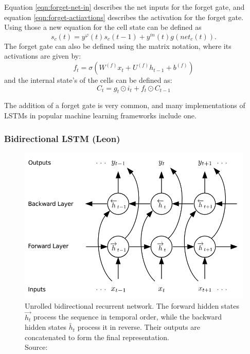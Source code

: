 \documentclass[twoside,a4paper,10pt,DIV=12,BCOR=12mm]{scrartcl}
\begin{document}
Equation \ref{eqn:forget-net-in} describes the net inputs for the forget gate, and equation \ref{eqn:forget-actiavtions} describes the activation for the forget gate. Using those a new equation for the cell state can be defined as\cite{gers1999forgetgate}
\begin{equation}
    s_c(t)=y^\varphi(t)s_c(t-1)+y^{in}(t)g\left(net_c(t)\right).    
\end{equation}
The forget gate can also be defined using the matrix notation, where its activations are given by:\cite{smagulova2019notation}
$$f_t=\sigma\left(W^{(f)}x_t+U^{(f)}h_{t-1}+b^{(f)}\right)$$
and the internal state's of the cells can be defined as:\cite{smagulova2019notation}
$$C_t=g_t\odot i_t+f_t\odot C_{t-1}$$

The addition of a forget gate is very common, and many implementations of LSTMs in popular machine learning frameworks include one.\cite{smagulova2019notation,keras-lstm, real-pytorch-lstm, pytorch-lstm} 

\subsubsection{Bidirectional LSTM (Leon)}

\begin{figure}[h!]
    \centering
    \includegraphics[height=7.5cm]{brnn.png}
    \caption{Unrolled bidirectional recurrent network. The forward hidden states $\overrightarrow{h_t}$ process the sequence in temporal order, while the backward hidden states $\overleftarrow{h_t}$ process it in reverse. Their outputs are concatenated to form the final representation.\\ Source: \cite{graves2013speechrecognitiondeeprecurrent}}
    \label{fig:brnn}
\end{figure}
\end{document}

